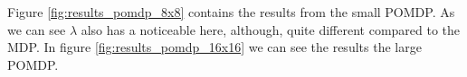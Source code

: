 \documentclass[12pt,A4]{report}
\theoremstyle{definition}
\begin{document}


Figure \ref{fig:results_pomdp_8x8} contains the results from the small POMDP. As we can see $\lambda$ also has a noticeable here, although, quite different compared to the MDP. In figure \ref{fig:results_pomdp_16x16} we can see the results the large POMDP.
\end{document}
